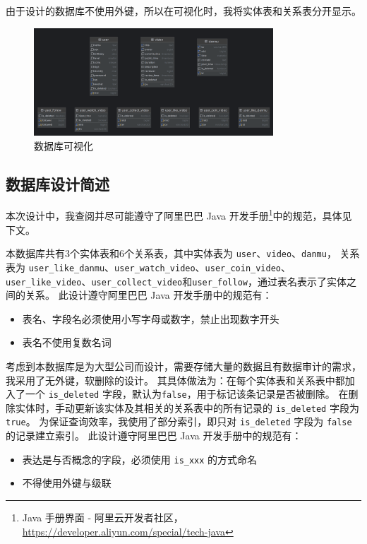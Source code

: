 \documentclass[a4paper,10pt]{ctexart}
\begin{document}
由于设计的数据库不使用外键，所以在可视化时，我将实体表和关系表分开显示。

\begin{figure}[H]
    \centering
    \includegraphics[width=0.8\textwidth]{Visualization.png}
    \caption{数据库可视化}
\end{figure}

\subsection{数据库设计简述}

本次设计中，我查阅并尽可能遵守了阿里巴巴 Java 开发手册\footnote{Java 手册界面 - 阿里云开发者社区，\url{https://developer.aliyun.com/special/tech-java}}中的规范，具体见下文。

本数据库共有3个实体表和6个关系表，其中实体表为 \texttt{user}、\texttt{video}、\texttt{danmu}，
关系表为 \texttt{user\_like\_danmu}、\texttt{user\_watch\_video}、\texttt{user\_coin\_video}、\texttt{user\_like\_video}、\texttt{user\_collect\_video}和\texttt{user\_follow}，通过表名表示了实体之间的关系。
此设计遵守阿里巴巴 Java 开发手册中的规范有：
\begin{itemize}
    \item 表名、字段名必须使用小写字母或数字，禁止出现数字开头
    \item 表名不使用复数名词
\end{itemize}

考虑到本数据库是为大型公司而设计，需要存储大量的数据且有数据审计的需求，我采用了无外键，软删除的设计。
其具体做法为：在每个实体表和关系表中都加入了一个 \texttt{is\_deleted} 字段，默认为\texttt{false}，用于标记该条记录是否被删除。
在删除实体时，手动更新该实体及其相关的关系表中的所有记录的 \texttt{is\_deleted} 字段为 \texttt{true}。
为保证查询效率，我使用了部分索引，即只对 \texttt{is\_deleted} 字段为 \texttt{false} 的记录建立索引。
此设计遵守阿里巴巴 Java 开发手册中的规范有：
\begin{itemize}
    \item 表达是与否概念的字段，必须使用 \texttt{is\_xxx} 的方式命名
    \item 不得使用外键与级联
\end{itemize}
\end{document}
